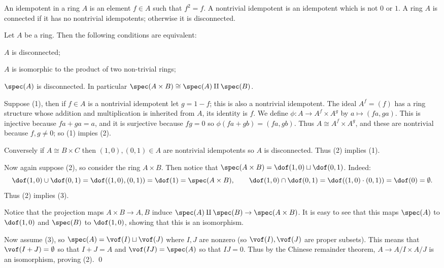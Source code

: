 \bdefn

    An {\emphcolor idempotent} in a ring $A$ is an element $f\in A$ such that $f^2=f$.
    A {\emphcolor nontrivial idempotent} is an idempotent which is not $0$ or $1$.
    A ring $A$ is {\emphcolor connected} if it has no nontrivial idempotents; otherwise it is {\emphcolor disconnected}.

\edefn

\bprop

    Let $A$ be a ring.
    Then the following conditions are equivalent:
    \benum
        \item $A$ is disconnected;
        \item $A$ is isomorphic to the product of two non-trivial rings;
        \item $\spec(A)$ is disconnected.
    \eenum
    In particular $\spec(A\times B)\cong\spec(A)\amalg\spec(B)$.

\eprop

\bproof

    Suppose (1), then if $f\in A$ is a nontrivial idempotent let $g=1-f$; this is also a nontrivial idempotent.
    The ideal $A^f=(f)$ has a ring structure whose addition and multiplication is inherited from $A$, its identity is $f$.
    We define $\phi\colon A\to A^f\times A^g$ by $a\mapsto(fa,ga)$.
    This is injective because $fa+ga=a$, and it is surjective because $fg=0$ so $\phi(fa+gb)=(fa,gb)$.
    Thus $A\cong A^f\times A^g$, and these are nontrivial because $f,g\neq0$; so (1) impies (2).

    Conversely if $A\cong B\times C$ then $(1,0),(0,1)\in A$ are nontrivial idempotents so $A$ is disconnected.
    Thus (2) implies (1).

    Now again suppose (2), so consider the ring $A\times B$.
    Then notice that $\spec(A\times B)=\dof(1,0)\sqcup\dof(0,1)$.
    Indeed:
    $$ \dof(1,0)\cup\dof(0,1) = \dof((1,0),(0,1)) = \dof(1) = \spec(A\times B),\qquad \dof(1,0)\cap\dof(0,1) = \dof((1,0)\cdot(0,1)) = \dof(0) = \emptyset . $$
    Thus (2) implies (3).

    Notice that the projection maps $A\times B\to A,B$ induce $\spec(A)\amalg\spec(B)\to\spec(A\times B)$.
    It is easy to see that this maps $\spec(A)$ to $\dof(1,0)$ and $\spec(B)$ to $\dof(1,0)$, showing that this is an isomorphism.

    Now assume (3), so $\spec(A)=\vof(I)\sqcup\vof(J)$ where $I,J$ are nonzero (so $\vof(I),\vof(J)$ are proper subsets).
    This means that $\vof(I+J)=\emptyset$ so that $I+J=A$ and $\vof(IJ)=\spec(A)$ so that $IJ=0$.
    Thus by the Chinese remainder theorem, $A\to A/I\times A/J$ is an isomorphism, proving (2).
    \qed

